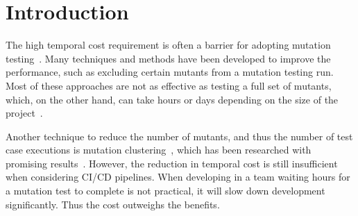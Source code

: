 \documentclass[conference,draftclsnofoot,onecolumn]{IEEEtran}
\begin{document}
\begin{abstract}
\end{abstract}

\begin{IEEEkeywords}

\end{IEEEkeywords}

\section{Introduction}
The high temporal cost requirement is often a barrier for adopting mutation testing~\cite{Pizzoleto2019}.
Many techniques and methods have been developed to improve the performance, such as excluding certain mutants from a mutation testing run. Most of these approaches are not as effective as testing a full set of mutants, which, on the other hand, can take hours or days depending on the size of the project~\cite{Pizzoleto2019,Yao2014}.

Another technique to reduce the number of mutants, and thus the number of test case executions is mutation clustering~\cite{Ma2016,Yu2019PossibilityScope}, which has been researched with promising results~\cite{Ji2009,Wilinski2015,Ma2016}. 
However, the reduction in temporal cost is still insufficient  when considering CI/CD pipelines. 
When developing in a team waiting hours for a mutation test to complete is not practical, it will slow down development significantly. 
Thus the cost outweighs the benefits.
\end{document}

